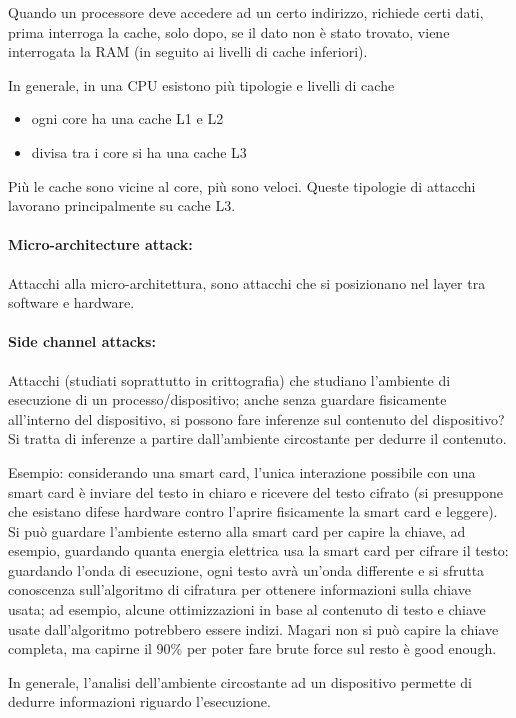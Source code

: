 Quando un processore deve accedere ad un certo indirizzo, richiede certi dati, prima interroga la cache, solo dopo, se il dato non è stato trovato, viene interrogata la RAM (in seguito ai livelli di cache inferiori).

In generale, in una CPU esistono più tipologie e livelli di cache 
\begin{itemize}
	\item ogni core ha una cache L1 e L2
	
    \item divisa tra i core si ha una cache L3
\end{itemize}
Più le cache sono vicine al core, più sono veloci. Queste tipologie di attacchi lavorano principalmente su cache L3. 

\paragraph{Micro-architecture attack:} Attacchi alla micro-architettura, sono attacchi che si posizionano nel layer tra software e hardware. 

\paragraph{Side channel attacks:} Attacchi (studiati soprattutto in crittografia) che studiano l'ambiente di esecuzione di un processo/dispositivo; anche senza guardare fisicamente all'interno del dispositivo, si possono fare inferenze sul contenuto del dispositivo? Si tratta di inferenze a partire dall'ambiente circostante per dedurre il contenuto.

Esempio: considerando una smart card, l'unica interazione possibile con una smart card è inviare del testo in chiaro e ricevere del testo cifrato (si presuppone che esistano difese hardware contro l'aprire fisicamente la smart card e leggere). Si può guardare l'ambiente esterno alla smart card per capire la chiave, ad esempio, guardando quanta energia elettrica usa la smart card per cifrare il testo: guardando l'onda di esecuzione, ogni testo avrà un'onda differente e si sfrutta conoscenza sull'algoritmo di cifratura per ottenere informazioni sulla chiave usata; ad esempio, alcune ottimizzazioni in base al contenuto di testo e chiave usate dall'algoritmo potrebbero essere indizi. Magari non si può capire la chiave completa, ma capirne il 90\% per poter fare brute force sul resto è good enough.

In generale, l'analisi dell'ambiente circostante ad un dispositivo permette di dedurre informazioni riguardo l'esecuzione.

